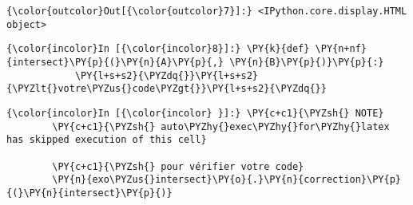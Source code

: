 \begin{Verbatim}[commandchars=\\\{\},frame=single,framerule=0.3mm,rulecolor=\color{cellframecolor}]
{\color{outcolor}Out[{\color{outcolor}7}]:} <IPython.core.display.HTML object>
\end{Verbatim}
            
    \begin{Verbatim}[commandchars=\\\{\},frame=single,framerule=0.3mm,rulecolor=\color{cellframecolor}]
{\color{incolor}In [{\color{incolor}8}]:} \PY{k}{def} \PY{n+nf}{intersect}\PY{p}{(}\PY{n}{A}\PY{p}{,} \PY{n}{B}\PY{p}{)}\PY{p}{:}
            \PY{l+s+s2}{\PYZdq{}}\PY{l+s+s2}{\PYZlt{}votre\PYZus{}code\PYZgt{}}\PY{l+s+s2}{\PYZdq{}}
\end{Verbatim}


    \begin{Verbatim}[commandchars=\\\{\},frame=single,framerule=0.3mm,rulecolor=\color{cellframecolor}]
{\color{incolor}In [{\color{incolor} }]:} \PY{c+c1}{\PYZsh{} NOTE}
        \PY{c+c1}{\PYZsh{} auto\PYZhy{}exec\PYZhy{}for\PYZhy{}latex has skipped execution of this cell}
        
        \PY{c+c1}{\PYZsh{} pour vérifier votre code}
        \PY{n}{exo\PYZus{}intersect}\PY{o}{.}\PY{n}{correction}\PY{p}{(}\PY{n}{intersect}\PY{p}{)}
\end{Verbatim}



    
    
    
